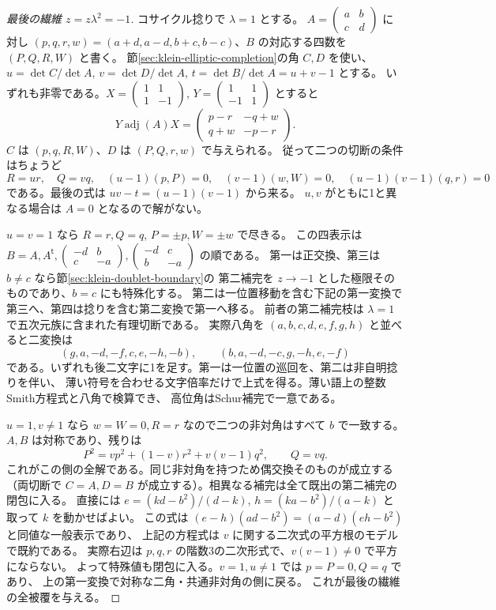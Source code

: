 \begin{proof}[最後の繊維 $z=z\lambda^2=-1$]
コサイクル捻りで $\lambda=1$ とする。
$A=\left(\begin{smallmatrix}a&b\\c&d\end{smallmatrix}\right)$ に対し
$(p,q,r,w)=(a+d,a-d,b+c,b-c)$、$B$ の対応する四数を $(P,Q,R,W)$ と書く。
節\ref{sec:klein-elliptic-completion}の角 $C,D$ を使い、
$u=\det C/\det A$, $v=\det D/\det A$, $t=\det B/\det A=u+v-1$ とする。
いずれも非零である。$X=\left(\begin{smallmatrix}1&1\\1&-1\end{smallmatrix}\right)$,
$Y=\left(\begin{smallmatrix}1&1\\-1&1\end{smallmatrix}\right)$ とすると
\[
 Y\operatorname{adj}(A) X=
 \begin{pmatrix}p-r&-q+w\\q+w&-p-r\end{pmatrix}.
\]
$C$ は $(p,q,R,W)$、$D$ は $(P,Q,r,w)$ で与えられる。
従って二つの切断の条件はちょうど
\[
 R=ur,\quad Q=vq,\quad (u-1)(p,P)=0,\quad (v-1)(w,W)=0,
 \quad (u-1)(v-1)(q,r)=0
\]
である。最後の式は $uv-t=(u-1)(v-1)$ から来る。
$u,v$ がともに1と異なる場合は $A=0$ となるので解がない。

$u=v=1$ なら $R=r,Q=q$, $P=\pm p,W=\pm w$ で尽きる。
この四表示は $B=A,A^{\mathsf t},
\left(\begin{smallmatrix}-d&b\\c&-a\end{smallmatrix}\right),
\left(\begin{smallmatrix}-d&c\\b&-a\end{smallmatrix}\right)$ の順である。
第一は正交換、第三は $b\ne c$ なら節\ref{sec:klein-doublet-boundary}の
第二補完を $z\to-1$ とした極限そのものであり、$b=c$ にも特殊化する。
第二は一位置移動を含む下記の第一変換で第三へ、第四は捻りを含む第二変換で第一へ移る。
前者の第二補完枝は $\lambda=1$ で五次元族に含まれた有理切断である。
実際八角を $(a,b,c,d,e,f,g,h)$ と並べると二変換は
\[
 (g,a,-d,-f,c,e,-h,-b),\qquad (b,a,-d,-c,g,-h,e,-f)
\]
である。いずれも後二文字に1を足す。第一は一位置の巡回を、第二は非自明捻りを伴い、
薄い符号を合わせる文字倍率だけで上式を得る。薄い語上の整数Smith方程式と八角で検算でき、
高位角はSchur補完で一意である。

$u=1,v\ne1$ なら $w=W=0,R=r$ なので二つの非対角はすべて $b$ で一致する。
$A,B$ は対称であり、残りは
\[
 P^2=v p^2+(1-v)r^2+v(v-1)q^2,\qquad Q=vq .
\]
これがこの側の全解である。同じ非対角を持つため偶交換そのものが成立する
（両切断で $C=A,D=B$ が成立する）。相異なる補完は全て既出の第二補完の閉包に入る。
直接には $e=(kd-b^2)/(d-k)$, $h=(ka-b^2)/(a-k)$ と取って $k$ を動かせばよい。
この式は $(e-h)(ad-b^2)=(a-d)(eh-b^2)$ と同値な一般表示であり、
上記の方程式は $v$ に関する二次式の平方根のモデルで既約である。
実際右辺は $p,q,r$ の階数3の二次形式で、$v(v-1)\ne0$ で平方にならない。
よって特殊値も閉包に入る。$v=1,u\ne1$ では $p=P=0,Q=q$ であり、
上の第一変換で対称な二角・共通非対角の側に戻る。
これが最後の繊維の全被覆を与える。
\end{proof}

